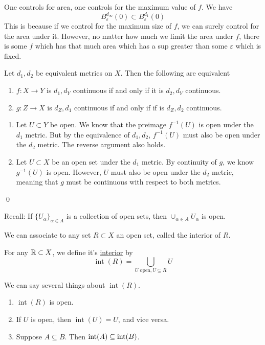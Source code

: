 \documentclass[x11names,reqno,14pt]{extarticle}
\newcommand*{\oo}{{\infty}}
\begin{document}
One controls for area, one controls for the maximum value of $f$. We have
\[
B^{d_\oo}_\varepsilon (0) \subset B^{d_1}_\varepsilon(0)
\] 
This is because if we control for the maximum size of $f$, we can surely control for the area under it. However, no matter how much we limit the area under $f$, there is some $f$ which has that much area which has a sup greater than some $\varepsilon$ which is fixed. 

\thm

Let $d_1, d_2$ be equivalent metrics on $X$. Then the following are equivalent
\begin{enumerate}
\item $f:X\to Y$ is $d_1, d_Y$ continuous if and only if it is $d_2, d_Y$ continuous. 
\item $g:Z\to X$ is $d_Z, d_1$ continuous if and only if if is $d_Z, d_2$ continuous. 
\end{enumerate}

\proof

\begin{enumerate}
\item Let $U \subset Y$ be open. We know that the preimage $f^{-1}(U)$ is open under the $d_1$ metric. But by the equivalence of $d_1, d_2$, $f^{-1}(U)$ must also be open under the $d_2$ metric. The reverse argument also holds. 
\item Let $U \subset X$ be an open set under the $d_1$ metric. By continuity of $g$, we know $g^{-1}(U)$ is open. However, $U$ must also be open under the $d_2$ metric, meaning that $g$ must be continuous with respect to both metrics. 
\end{enumerate}

\qed

Recall: If $\{U_\alpha\}_{\alpha\in A}$ is a collection of open sets, then $\cup_{\alpha\in A}U_\alpha$ is open. 

We can associate to any set $R\subset X$ an open set, called the interior of $R$. 


For any $\mathbb{R}\subset X$, we define it's \underline{interior} by 
\[
\operatorname{int}(R) = \bigcup_{U\text{ open}, U \subseteq R}U
\]

We can say several things about $\operatorname{int}(R)$. 
\begin{enumerate}
\item $\operatorname{int}(R)$ is open. 
\item If $U$ is open, then $\operatorname{int}(U) = U$, and vice versa. 
\item Suppose $A \subseteq B$. Then $\operatorname{int}(A) \subseteq \operatorname{\text{int}}(B)$. 
\end{enumerate}
\end{document}
